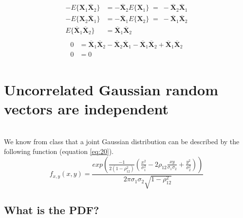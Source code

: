 \documentclass[12pt,letterpaper, onecolumn]{exam}
\begin{document}
\begin{questions}
\begin{parts}
\begin{equation}
\begin{split}
                            -E\{\mathbf{X}_1\overline{\mathbf{X}}_2\} & = -\overline{\mathbf{X}}_2E\{\mathbf{X}_1\} \; = \;-\overline{\mathbf{X}}_2\overline{\mathbf{X}}_1 \\
                            -E\{\mathbf{X}_2\overline{\mathbf{X}}_1\} & = -\overline{\mathbf{X}}_1E\{\mathbf{X}_2\} \; = \;-\overline{\mathbf{X}}_1\overline{\mathbf{X}}_2 \\
                            E\{\overline{\mathbf{X}}_1\overline{\mathbf{X}}_2\} & = \overline{\mathbf{X}}_1\overline{\mathbf{X}}_2\\
                        \end{split}
                    \end{equation}
                    \begin{equation}
                        \begin{split}
                            0 & = \overline{\mathbf{X}}_1\overline{\mathbf{X}}_2 -\overline{\mathbf{X}}_2\overline{\mathbf{X}}_1 -\overline{\mathbf{X}}_1\overline{\mathbf{X}}_2 + \overline{\mathbf{X}}_1\overline{\mathbf{X}}_2\\
                            0 & = 0\\
                        \end{split}
                    \end{equation}
            \part{Uncorrelated Gaussian random vectors are independent}\\
                \solution
                    We know from class that a joint Gaussian distribution can be described by the following function (equation \ref{eq:20}).\\
                    \begin{equation}\label{eq:20}
                        f_{x,y}(x,y) = \frac{exp\left(\frac{-1}{2(1 - \rho_{12}^2)}\left(\frac{x^2}{\sigma_1^2} - 2\rho_{12}\frac{xy}{\sigma_1\sigma_2}+\frac{y^2}{\sigma^2_2}\right) \right)}{2\pi\sigma_1\sigma_2\sqrt{1 - \rho_{12}^2}}
                    \end{equation}
        \end{parts}    
 \clearpage   
        \begin{parts}
            \part{What is the PDF?}\\
                \solution

\end{parts}
\end{questions}
\end{document}
